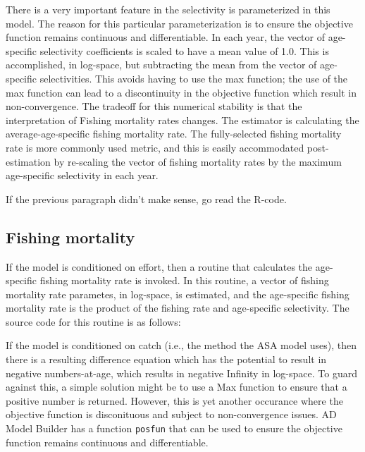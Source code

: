 \documentclass[12pt,letterpaper]{article}
\begin{document}
      There is a very important feature in the selectivity is parameterized in this model.  The reason for this particular parameterization is to ensure the objective function remains continuous and differentiable.  In each year, the vector of age-specific selectivity coefficients is scaled to have a mean value of 1.0.  This is accomplished, in log-space, but subtracting the mean from the vector of age-specific selectivities.  This avoids having to use the max function; the use of the max function can lead to a discontinuity in the objective function which result in non-convergence.  The tradeoff for this numerical stability is that the interpretation of Fishing mortality rates changes.  The estimator is calculating the average-age-specific fishing mortality rate.  The fully-selected fishing mortality rate is more commonly used metric, and this is easily accommodated post-estimation by re-scaling the vector of fishing mortality rates by the maximum age-specific selectivity in each year. 

      If the previous paragraph didn't make sense, go read the R-code.


  \subsection{Fishing mortality} %
  \label{sub:fishing_mortality}
  If the model is conditioned on effort, then a routine that calculates the age-specific fishing mortality rate is invoked.  In this routine, a vector of fishing mortality rate parametes, in log-space, is estimated, and the age-specific fishing mortality rate is the product of the fishing rate and age-specific selectivity.  The source code for this routine is as follows:
  

  If the model is conditioned on catch (i.e., the method the ASA model uses), then there is a resulting difference equation which has the potential to result in negative numbers-at-age, which results in negative Infinity in log-space.  To guard against this, a simple solution might be to use a Max function to ensure that a positive number is returned. However, this is yet another occurance where the objective function is disconituous and subject to non-convergence issues.  AD Model Builder has a function \texttt{posfun} that can be used to ensure the objective function remains continuous and differentiable.
\end{document}
